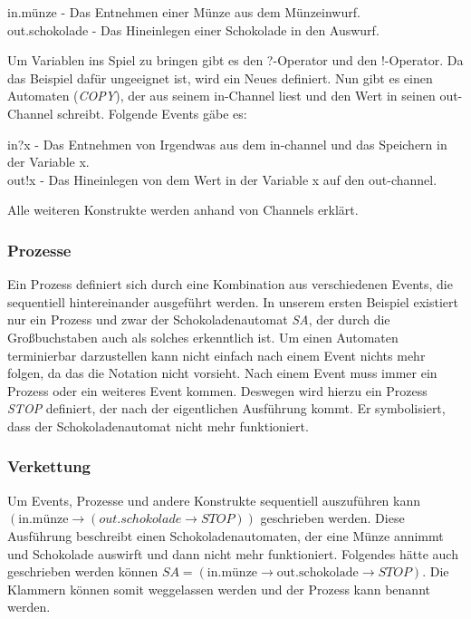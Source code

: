 \begin{addmargin}[1cm]{0cm}
in.münze - Das Entnehmen einer Münze aus dem Münzeinwurf.\\
out.schokolade - Das Hineinlegen einer Schokolade in den Auswurf.
\end{addmargin}

Um Variablen ins Spiel zu bringen gibt es den ?-Operator und den !-Operator. Da das Beispiel dafür ungeeignet ist, wird ein Neues definiert. Nun gibt es einen Automaten (\textit{COPY}), der aus seinem in-Channel liest und den Wert in seinen out-Channel schreibt. Folgende Events gäbe es:

\begin{addmargin}[1cm]{0cm}
in?x - Das Entnehmen von Irgendwas aus dem in-channel und das Speichern in der Variable x.\\
out!x - Das Hineinlegen von dem Wert in der Variable x auf den out-channel.
\end{addmargin}

Alle weiteren Konstrukte werden anhand von Channels erklärt.

\subsubsection{Prozesse}
Ein Prozess definiert sich durch eine Kombination aus verschiedenen Events, die sequentiell hintereinander ausgeführt werden. In unserem ersten Beispiel existiert nur ein Prozess und zwar der Schokoladenautomat \textit{SA}, der durch die Großbuchstaben auch als solches erkenntlich ist. Um einen Automaten terminierbar darzustellen kann nicht einfach nach einem Event nichts mehr folgen, da das die Notation nicht vorsieht. Nach einem Event muss immer ein Prozess oder ein weiteres Event kommen. Deswegen wird hierzu ein Prozess \textit{STOP} definiert, der nach der eigentlichen Ausführung kommt. Er symbolisiert, dass der Schokoladenautomat nicht mehr funktioniert.

\subsubsection{Verkettung}
Um Events, Prozesse und andere Konstrukte sequentiell auszuführen kann $ (\text{in.münze} \rightarrow (out.schokolade \rightarrow STOP)) $ geschrieben werden. Diese Ausführung beschreibt einen Schokoladenautomaten, der eine Münze annimmt und Schokolade auswirft und dann nicht mehr funktioniert. Folgendes hätte auch geschrieben werden können $ SA = (\text{in.münze} \rightarrow \text{out.schokolade} \rightarrow STOP) $. Die Klammern können somit weggelassen werden und der Prozess kann benannt werden.

